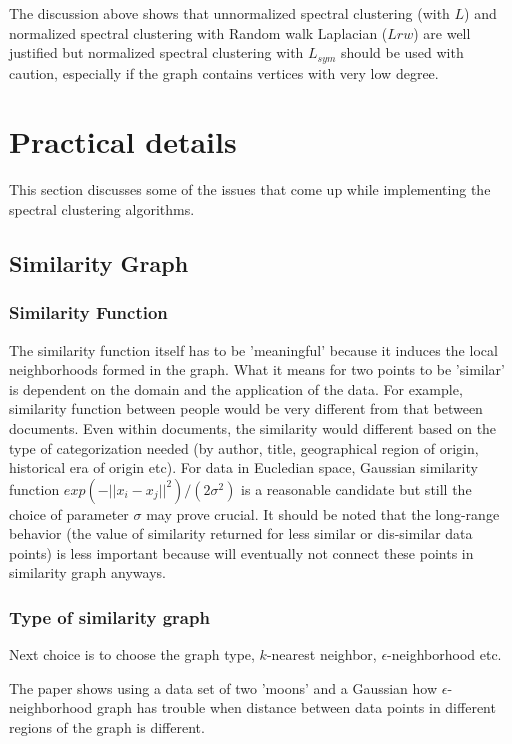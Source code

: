 \documentclass[10pt,a4paper, nocenter]{report}
\newcommand{\norm}[1]{\lvert\lvert {#1} \rvert\rvert}
\begin{document}
	The discussion above shows that unnormalized spectral clustering (with $L$) and normalized spectral clustering with Random walk Laplacian ($Lrw$) are well justified but normalized spectral clustering with $L_{sym}$ should be used with caution, especially if the graph contains vertices with very low degree. 
	
	\chapter{Practical details}
	
	This section discusses some of the issues that come up while implementing the spectral clustering algorithms.
	
	\section{Similarity Graph}
	\subsection{Similarity Function}
	The similarity function itself has to be 'meaningful' because it induces the local neighborhoods formed in the graph. What it means for two points to be 'similar' is dependent on the domain and the application of the data. For example, similarity function between people would be very different from that between documents. Even within documents, the similarity would different based on the type of categorization needed (by author, title, geographical region of origin, historical era of origin etc). For data in Eucledian space, Gaussian similarity function $exp(-\norm{x_{i}-x_{j}}^{2})/(2\sigma^{2})$ is a reasonable candidate but still the choice of parameter $\sigma$ may prove crucial. It should be noted that the long-range behavior (the value of similarity returned for less similar or dis-similar data points) is less important because will  eventually not connect these points in similarity graph anyways.
	\subsection{Type of similarity graph}
	Next choice is to choose the graph type, $k$-nearest neighbor, $\epsilon$-neighborhood etc. 
	
	The paper shows using a data set of two 'moons' and a Gaussian how $\epsilon$-neighborhood graph has trouble when distance between data points in different regions of the graph is different. 
	
\end{document}
